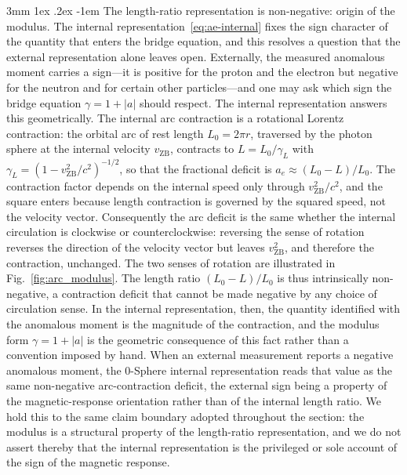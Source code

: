 \documentclass[%
 reprint, amsmath,amssymb, aps, prb, ]{revtex4-2}
\makeatletter
\numberwithin{equation}{section}
\renewcommand\paragraph{%
  \@startsection{paragraph}{4}{\z@}%
    {3mm \@plus 1ex \@minus .2ex}%
    {-1em}%
    {\normalfont\normalsize\itshape}}
\newcommand{\vZB}{v_{\text{ZB}}}
\newcommand{\gammaL}{\gamma_{L}}
\makeatother
\begin{document}
\paragraph{The length-ratio representation is non-negative: origin of the modulus.}
The internal representation~\eqref{eq:ae-internal} fixes the sign character of the quantity that enters the bridge equation, and this resolves a question that the external representation alone leaves open. Externally, the measured anomalous moment carries a sign---it is positive for the proton and the electron but negative for the neutron and for certain other particles---and one may ask which sign the bridge equation $\gamma = 1 + \lvert a\rvert$ should respect. The internal representation answers this geometrically. The internal arc contraction is a rotational Lorentz contraction: the orbital arc of rest length $L_0 = 2\pi r$, traversed by the photon sphere at the internal velocity $\vZB$, contracts to $L = L_0/\gammaL$ with $\gammaL = (1 - \vZB^2/c^2)^{-1/2}$, so that the fractional deficit is $a_e \approx (L_0 - L)/L_0$. The contraction factor depends on the internal speed only through $\vZB^2/c^2$, and the square enters because length contraction is governed by the squared speed, not the velocity vector. Consequently the arc deficit is the same whether the internal circulation is clockwise or counterclockwise: reversing the sense of rotation reverses the direction of the velocity vector but leaves $\vZB^2$, and therefore the contraction, unchanged. The two senses of rotation are illustrated in Fig.~\ref{fig:arc_modulus}. The length ratio $(L_0 - L)/L_0$ is thus intrinsically non-negative, a contraction deficit that cannot be made negative by any choice of circulation sense. In the internal representation, then, the quantity identified with the anomalous moment is the magnitude of the contraction, and the modulus form $\gamma = 1 + \lvert a\rvert$ is the geometric consequence of this fact rather than a convention imposed by hand. When an external measurement reports a negative anomalous moment, the 0-Sphere internal representation reads that value as the same non-negative arc-contraction deficit, the external sign being a property of the magnetic-response orientation rather than of the internal length ratio. We hold this to the same claim boundary adopted throughout the section: the modulus is a structural property of the length-ratio representation, and we do not assert thereby that the internal representation is the privileged or sole account of the sign of the magnetic response.
\end{document}
